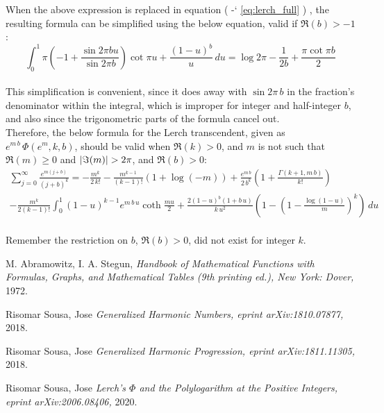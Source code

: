 \documentclass[12pt]{article}
\DeclarePairedDelimiter\abs{\lvert}{\rvert}%
\newcommand*{\eqrefe}[1]{%
\begingroup
(\color{BrickRed}
\romannumeral-`\x %
\setcitestyle{numbers}%
\ref{eq:#1}%
\endgroup
)\ignorespacesafterend
}
\begin{document}
When the above expression is replaced in equation \eqrefe{lerch_full}, the resulting formula can be simplified using the below equation, valid if $\Re{(b)}>-1$: 
\begin{equation} \nonumber 
\int_0^1 \pi\left(-1+\frac{\sin{2\pi b u}}{\sin{2\pi b}}\right)\cot{\pi u}+\frac{(1-u)^{b}}{u}\,du=\log{2\pi}-\frac{1}{2b}+\frac{\pi\cot{\pi b}}{2} \text{}
\end{equation}\\
\indent This simplification is convenient, since it does away with $\sin{2\pi\,b}$ in the fraction's denominator within the integral, which is improper for integer and half-integer $b$, and also since the trigonometric parts of the formula cancel out.\\

Therefore, the below formula for the Lerch transcendent, given as $e^{m\,b}\,\Phi(e^m,k,b)$, should be valid when $\Re{(k)}>0$, and $m$ is not such that $\Re{(m)}\ge 0$ and $\abs{\Im{(m)}}>2\pi$, and $\Re{(b)}>0$:
\begin{multline} \nonumber 
\sum _{j=0}^{\infty}\frac{e^{m(j+b)}}{(j+b)^{k}}=-\frac{m^k}{2\,k!}-\frac{m^{k-1}}{(k-1)!}\left(1+\log{(-m)}\right)+\frac{e^{m\,b}}{2\,b^k}\left(1+\frac{\Gamma{\left(k+1,m\,b\right)}}{k!}\right)
\\-\frac{m^{k}}{2(k-1)!}\int_0^1(1-u)^{k-1}e^{m\,b\,u}\coth{\frac{m u}{2}}+\frac{2(1-u)^{b}\left(1+b\,u\right)}{k\,u^2}\left(1-\left(1-\frac{\log{(1-u)}}{m}\right)^k\right)\,du 
\end{multline}\\
\indent Remember the restriction on $b$, $\Re{(b)}>0$, did not exist for integer $k$.

\newpage

\begin{thebibliography}{1}

 M. Abramowitz, I. A. Stegun, {\em Handbook of Mathematical Functions with Formulas, Graphs, and Mathematical Tables (9th printing ed.), New York: Dover,}  1972.

 Risomar Sousa, Jose {\em Generalized Harmonic Numbers, eprint arXiv:1810.07877,} 2018.

 Risomar Sousa, Jose {\em Generalized Harmonic Progression, eprint arXiv:1811.11305,} 2018.

 Risomar Sousa, Jose {\em Lerch's $\Phi$ and the Polylogarithm at the Positive Integers, eprint arXiv:2006.08406,} 2020.

\end{thebibliography}
\end{document}
